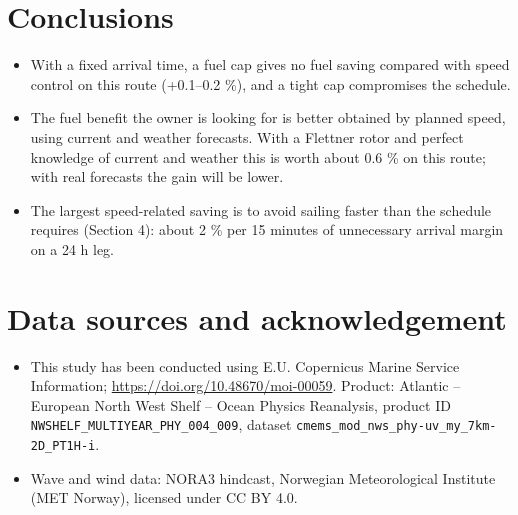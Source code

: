 \documentclass[a4paper,11pt]{article}
\begin{document}
\section{Conclusions}
\label{sec:orgb338d81}

\begin{itemize}
\item With a fixed arrival time, a fuel cap gives no fuel saving compared
with speed control on this route (+0.1--0.2 \%), and a tight cap
compromises the schedule.
\item The fuel benefit the owner is looking for is better obtained by
planned speed, using current and weather forecasts.
With a Flettner rotor and perfect knowledge of current and weather this
is worth about 0.6 \% on this route; with real forecasts the gain will
be lower.
\item The largest speed-related saving is to avoid sailing faster than the
schedule requires (Section 4): about 2 \% per 15 minutes of unnecessary
arrival margin on a 24 h leg.
\end{itemize}

\section{Data sources and acknowledgement}
\label{sec:org436cf91}

\begin{itemize}
\item This study has been conducted using E.U. Copernicus Marine Service
Information; \url{https://doi.org/10.48670/moi-00059}.  Product: Atlantic --
European North West Shelf -- Ocean Physics Reanalysis, product ID
\texttt{NWSHELF\_MULTIYEAR\_PHY\_004\_009}, dataset
\texttt{cmems\_mod\_nws\_phy-uv\_my\_7km-2D\_PT1H-i}.
\item Wave and wind data: NORA3 hindcast, Norwegian Meteorological Institute
(MET Norway), licensed under CC BY 4.0.
\end{itemize}
\end{document}
